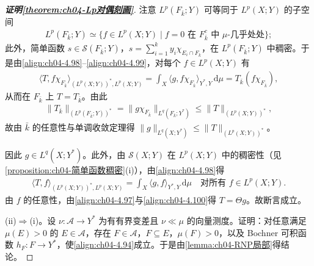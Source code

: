\documentclass[../../main.tex]{subfiles}%
\begin{document}
\begin{proof}[\textbf{证明\cref{theorem:ch04-Lp对偶刻画}}]
注意 $L^p(F_{\bar k};Y)$ 可等同于 $L^p(X;Y)$ 的子空间
\begin{align*}
L^p(F_{\bar k};Y)\simeq\{f\in L^p(X;Y)\mid f=0\text{ 在 }F_{\bar k}^c\text{ 中 }\mu\text{-几乎处处}\};
\end{align*}
此外，简单函数 $s\in\mathcal{S}(F_{\bar k};Y)$，$s=\sum_{i=1}^ky_i\chi_{E_i\cap F_{\bar k}}$，在 $L^p(F_{\bar k};Y)$ 中稠密。于是由\eqref{align:ch04-4.98}--\eqref{align:ch04-4.99}，对每个 $f\in L^p(X;Y)$ 有
\begin{align*}
\langle T,f\chi_{F_{\bar k}}\rangle_{(L^p(X;Y))^*,L^p(X;Y)}=\int_X\langle g,f\chi_{F_{\bar k}}\rangle_{Y^*,Y}\,\mathrm{d}\mu=T_{\bar k}(f\chi_{F_{\bar k}}),
\end{align*}
从而在 $F_{\bar k}$ 上 $T=T_{\bar k}$。由此
\begin{align*}
\|T_{\bar k}\|_{(L^p(F_{\bar k};Y))^*}=\|g\chi_{F_{\bar k}}\|_{L^q(F_{\bar k};Y^*)}\leqslant\|T\|_{(L^p(X;Y))^*},
\end{align*}
故由 $\bar k$ 的任意性与单调收敛定理得 $\|g\|_{L^q(X;Y^*)}\leqslant\|T\|_{(L^p(X;Y))^*}$。

因此 $g\in L^q(X;Y^*)$。此外，由 $\mathcal{S}(X;Y)$ 在 $L^p(X;Y)$ 中的稠密性（见\cref{proposition:ch04-简单函数稠密}(i)），由\eqref{align:ch04-4.98}得
\begin{align}
\langle T,f\rangle_{(L^p(X;Y))^*,L^p(X;Y)}=\int_X\langle g,f\rangle_{Y^*,Y}\,\mathrm{d}\mu\quad\text{对所有 }f\in L^p(X;Y). \label{align:ch04-4.100}
\end{align}
由 $f$ 的任意性，由\eqref{align:ch04-4.97}与\eqref{align:ch04-4.100}得 $T=\Theta g$。故断言成立。

(ii)$\Rightarrow$(i)。设 $\nu:\mathcal{A}\to Y^*$ 为有有界变差且 $\nu\ll\mu$ 的向量测度。证明：对任意满足 $\mu(E)>0$ 的 $E\in\mathcal{A}$，存在 $F\in\mathcal{A}$，$F\subseteq E$，$\mu(F)>0$，以及 Bochner 可积函数 $h_F:F\to Y^*$，使\eqref{align:ch04-4.94}成立。于是由\cref{lemma:ch04-RNP局部}得结论。


\end{proof}
\end{document}

